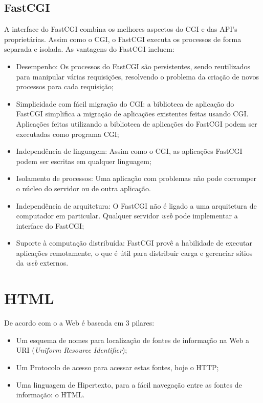 \subsection{FastCGI}
A interface do FastCGI combina os melhores aspectos do CGI e das API's proprietárias. Assim como o CGI, o FastCGI executa os processos de forma separada e isolada. As vantagens do FastCGI incluem:
\begin{itemize}
	\item Desempenho: Os processos do FastCGI são persistentes, sendo 
	reutilizados para manipular várias requisições, resolvendo o problema da 
	criação de novos processos para cada requisição;
	\item Simplicidade com fácil migração do CGI: a biblioteca de aplicação do FastCGI simplifica a migração de aplicações existentes feitas usando CGI. Aplicações feitas utilizando a biblioteca de aplicações do FastCGI podem ser executadas como programa CGI;
	\item Independência de linguagem: Assim como o CGI, as aplicações FastCGI 
	podem ser escritas em qualquer linguagem;
	\item Isolamento de processos: Uma aplicação com problemas não pode 
	corromper o núcleo do servidor ou de outra aplicação.
	\item Independência de arquitetura: O FastCGI não é ligado a uma arquitetura de computador em particular. Qualquer servidor \textit{web} pode implementar a interface do FastCGI;
	\item Suporte à computação distribuída: FastCGI provê a habilidade de 
	executar aplicações remotamente, o que é útil para distribuir carga e 
	gerenciar sítios da \textit{web} externos.
\end{itemize}
\section{HTML}
De acordo com o  a Web é baseada em 3 pilares:
\begin{itemize}
\item Um esquema de nomes para localização de fontes de informação na Web a URI 
(\textit{Uniform Resource Identifier});
\item Um Protocolo de acesso para acessar estas fontes, hoje o HTTP;
\item Uma linguagem de Hipertexto, para a fácil navegação entre as fontes de informação: o HTML.
\end{itemize}
